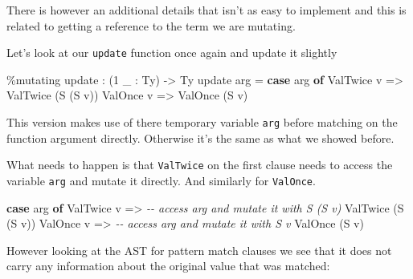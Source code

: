 \documentclass[
]{article}
\newenvironment{Shaded}{}{}
\newcommand{\CommentTok}[1]{\textcolor[rgb]{0.38,0.63,0.69}{\textit{#1}}}
\newcommand{\DataTypeTok}[1]{\textcolor[rgb]{0.56,0.13,0.00}{#1}}
\newcommand{\DecValTok}[1]{\textcolor[rgb]{0.25,0.63,0.44}{#1}}
\newcommand{\KeywordTok}[1]{\textcolor[rgb]{0.00,0.44,0.13}{\textbf{#1}}}
\newcommand{\NormalTok}[1]{#1}
\newcommand{\OperatorTok}[1]{\textcolor[rgb]{0.40,0.40,0.40}{#1}}
\newcommand{\OtherTok}[1]{\textcolor[rgb]{0.00,0.44,0.13}{#1}}
\begin{document}
There is however an additional details that isn't as easy to implement
and this is related to getting a reference to the term we are mutating.

Let's look at our \texttt{update} function once again and update it
slightly

\begin{Shaded}
\begin{Highlighting}[]
\OperatorTok{\%}\NormalTok{mutating}
\NormalTok{update }\OperatorTok{:}\NormalTok{ (}\DecValTok{1}\NormalTok{ \_ }\OperatorTok{:} \DataTypeTok{Ty}\NormalTok{) }\OtherTok{{-}\textgreater{}} \DataTypeTok{Ty}
\NormalTok{update arg }\OtherTok{=} \KeywordTok{case}\NormalTok{ arg }\KeywordTok{of}
                  \DataTypeTok{ValTwice}\NormalTok{ v }\OtherTok{=\textgreater{}} \DataTypeTok{ValTwice}\NormalTok{ (}\DataTypeTok{S}\NormalTok{ (}\DataTypeTok{S}\NormalTok{ v))}
                  \DataTypeTok{ValOnce}\NormalTok{ v }\OtherTok{=\textgreater{}} \DataTypeTok{ValOnce}\NormalTok{ (}\DataTypeTok{S}\NormalTok{ v)}
\end{Highlighting}
\end{Shaded}

This version makes use of there temporary variable \texttt{arg} before
matching on the function argument directly. Otherwise it's the same as
what we showed before.

What needs to happen is that \texttt{ValTwice} on the first clause needs
to access the variable \texttt{arg} and mutate it directly. And
similarly for \texttt{ValOnce}.

\begin{Shaded}
\begin{Highlighting}[]
\KeywordTok{case}\NormalTok{ arg }\KeywordTok{of}
     \DataTypeTok{ValTwice}\NormalTok{ v }\OtherTok{=\textgreater{}} \CommentTok{{-}{-} access \textasciigrave{}arg\textasciigrave{} and mutate it with S (S v)}
                   \DataTypeTok{ValTwice}\NormalTok{ (}\DataTypeTok{S}\NormalTok{ (}\DataTypeTok{S}\NormalTok{ v))}
     \DataTypeTok{ValOnce}\NormalTok{ v }\OtherTok{=\textgreater{}} \CommentTok{{-}{-} access \textasciigrave{}arg\textasciigrave{} and mutate it with S v}
                  \DataTypeTok{ValOnce}\NormalTok{ (}\DataTypeTok{S}\NormalTok{ v)}
\end{Highlighting}
\end{Shaded}

However looking at the AST for pattern match clauses we see that it does
not carry any information about the original value that was matched:
\end{document}
